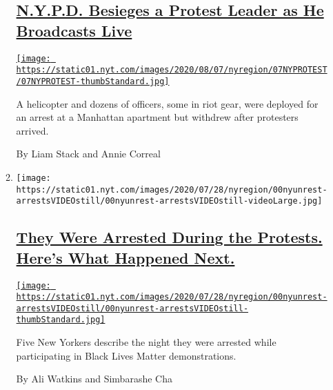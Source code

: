 \begin{enumerate}
\begin{enumerate}
    \hypertarget{nypd-besieges-a-protest-leader-as-he-broadcasts-live}{%
    \subsection{\texorpdfstring{\href{/2020/08/07/nyregion/nypd-derrick-ingram-protester.html}{N.Y.P.D.
    Besieges a Protest Leader as He Broadcasts
    Live}}{N.Y.P.D. Besieges a Protest Leader as He Broadcasts Live}}\label{nypd-besieges-a-protest-leader-as-he-broadcasts-live}}

    \href{/2020/08/07/nyregion/nypd-derrick-ingram-protester.html}{\texttt{[image: https://static01.nyt.com/images/2020/08/07/nyregion/07NYPROTEST/07NYPROTEST-thumbStandard.jpg]}}

    A helicopter and dozens of officers, some in riot gear, were
    deployed for an arrest at a Manhattan apartment but withdrew after
    protesters arrived.

    By Liam Stack and Annie Correal
  \item
    \texttt{[image: https://static01.nyt.com/images/2020/07/28/nyregion/00nyunrest-arrestsVIDEOstill/00nyunrest-arrestsVIDEOstill-videoLarge.jpg]}

    \hypertarget{they-were-arrested-during-the-protests-heres-what-happened-next}{%
    \subsection{\texorpdfstring{\href{/2020/08/07/nyregion/ny-protest-arrests.html}{They
    Were Arrested During the Protests. Here's What Happened
    Next.}}{They Were Arrested During the Protests. Here's What Happened Next.}}\label{they-were-arrested-during-the-protests-heres-what-happened-next}}

    \href{/2020/08/07/nyregion/ny-protest-arrests.html}{\texttt{[image: https://static01.nyt.com/images/2020/07/28/nyregion/00nyunrest-arrestsVIDEOstill/00nyunrest-arrestsVIDEOstill-thumbStandard.jpg]}}

    Five New Yorkers describe the night they were arrested while
    participating in Black Lives Matter demonstrations.

    By Ali Watkins and Simbarashe Cha
  \end{enumerate}
\end{enumerate}


